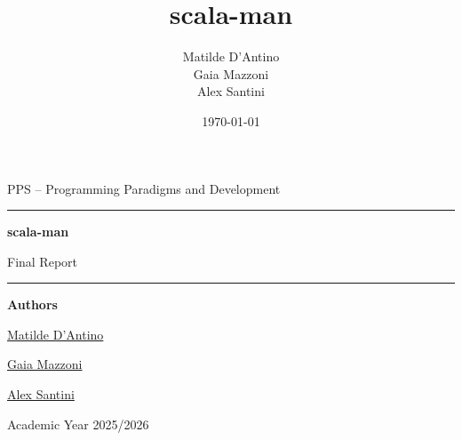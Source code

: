 \documentclass[11pt,a4paper]{report}
\title{scala-man}
\author{%
  Matilde D'Antino\\%
  Gaia Mazzoni\\%
  Alex Santini%
}
\date{\today}
\newcommand{\todayFullUS}{\DTMtoday}
\begin{document}
\begin{titlepage}
    \centering
    \vspace*{2.2cm}

    {\Large PPS -- Programming Paradigms and Development\par}
    \vspace{1.2cm}
    {\rule{0.82\textwidth}{0.5pt}\par}
    \vspace{0.9cm}
    {\huge\bfseries scala-man\par}
    \vspace{0.35cm}
    {\LARGE Final Report\par}
    \vspace{0.45cm}
    \vspace{0.9cm}
    {\rule{0.82\textwidth}{0.5pt}\par}

    \vspace{1.6cm}
    {\large\textbf{Authors}\par}
    \vspace{0.25cm}
    {\large \href{https://github.com/matidan01}{Matilde D'Antino}\par}
    {\large \href{https://github.com/GaiaMazzoni}{Gaia Mazzoni}\par}
    {\large \href{https://github.com/AlexSantini10}{Alex Santini}\par}

    \vfill
    {\large Academic Year 2025/2026\par}
    {\large \todayFullUS\par}
\end{titlepage}

\tableofcontents
\clearpage









\end{document}
